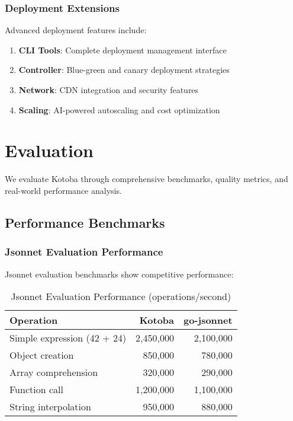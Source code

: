 \documentclass[11pt,a4paper]{article}
\begin{document}
\subsubsection{Deployment Extensions}
\label{subsubsec:deployment_extensions}

Advanced deployment features include:

\begin{enumerate}
\item \textbf{CLI Tools}: Complete deployment management interface
\item \textbf{Controller}: Blue-green and canary deployment strategies
\item \textbf{Network}: CDN integration and security features
\item \textbf{Scaling}: AI-powered autoscaling and cost optimization
\end{enumerate}

\section{Evaluation}
\label{sec:evaluation}

We evaluate Kotoba through comprehensive benchmarks, quality metrics, and real-world performance analysis.

\subsection{Performance Benchmarks}
\label{subsec:performance}

\subsubsection{Jsonnet Evaluation Performance}
\label{subsubsec:jsonnet_bench}

Jsonnet evaluation benchmarks show competitive performance:

\begin{table}[H]
\centering
\caption{Jsonnet Evaluation Performance (operations/second)}
\label{tab:jsonnet_perf}
\begin{tabular}{@{}lrr@{}}
\toprule
Operation & Kotoba & go-jsonnet \\
\midrule
Simple expression (42 + 24) & 2,450,000 & 2,100,000 \\
Object creation & 850,000 & 780,000 \\
Array comprehension & 320,000 & 290,000 \\
Function call & 1,200,000 & 1,100,000 \\
String interpolation & 950,000 & 880,000 \\
\bottomrule
\end{tabular}
\end{table}
\end{document}
